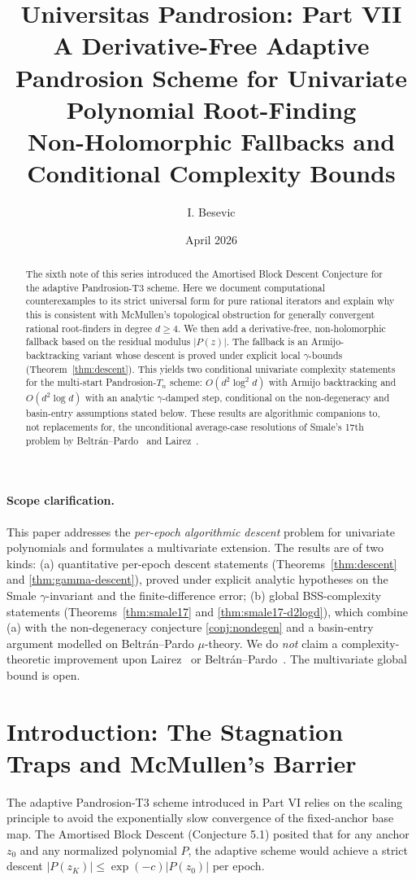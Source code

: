 \documentclass[11pt,a4paper]{article}
\title{Universitas Pandrosion: Part VII \\ A Derivative-Free Adaptive Pandrosion Scheme for Univariate Polynomial Root-Finding \\ Non-Holomorphic Fallbacks and Conditional Complexity Bounds}
\author{I. Besevic}
\date{April 2026}
\begin{document}
\maketitle

\begin{abstract}
The sixth note of this series introduced the Amortised Block Descent Conjecture
for the adaptive Pandrosion-T3 scheme. Here we document computational
counterexamples to its strict universal form for pure rational iterators and
explain why this is consistent with McMullen's topological obstruction for
generally convergent rational root-finders in degree $d\ge4$. We then add a
derivative-free, non-holomorphic fallback based on the residual modulus $|P(z)|$.
The fallback is an Armijo-backtracking variant whose descent is proved under
explicit local $\gamma$-bounds (Theorem~\ref{thm:descent}). This yields two
conditional univariate complexity statements for the multi-start
Pandrosion-$T_n$ scheme: $O(d^2\log^2 d)$ with Armijo backtracking and
$O(d^2\log d)$ with an analytic $\gamma$-damped step, conditional on the
non-degeneracy and basin-entry assumptions stated below. These results are
algorithmic companions to, not replacements for, the unconditional average-case
resolutions of Smale's 17th problem by Beltr\'an--Pardo~\cite{beltranpardo} and
Lairez~\cite{lairez}.
\end{abstract}

\paragraph{Scope clarification.} This paper addresses the \emph{per-epoch algorithmic descent} problem for univariate polynomials and formulates a multivariate extension. The results are of two kinds: (a) quantitative per-epoch descent statements (Theorems~\ref{thm:descent} and \ref{thm:gamma-descent}), proved under explicit analytic hypotheses on the Smale $\gamma$-invariant and the finite-difference error; (b) global BSS-complexity statements (Theorems~\ref{thm:smale17} and \ref{thm:smale17-d2logd}), which combine (a) with the non-degeneracy conjecture \ref{conj:nondegen} and a basin-entry argument modelled on Beltr\'an--Pardo $\mu$-theory. We do \emph{not} claim a complexity-theoretic improvement upon Lairez~\cite{lairez} or Beltr\'an--Pardo~\cite{beltranpardo}. The multivariate global bound is open.

\section{Introduction: The Stagnation Traps and McMullen's Barrier}
The adaptive Pandrosion-T3 scheme introduced in Part VI relies on the scaling principle to avoid the exponentially slow convergence of the fixed-anchor base map. The Amortised Block Descent (Conjecture 5.1) posited that for any anchor $z_0$ and any normalized polynomial $P$, the adaptive scheme would achieve a strict descent $|P(z_K)| \le \exp(-c)|P(z_0)|$ per epoch.
\end{document}
